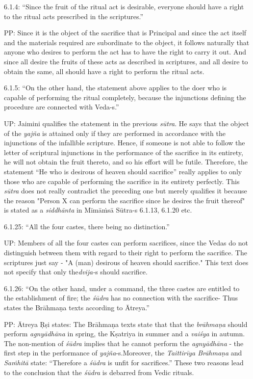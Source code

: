 6.1.4: “Since the fruit of the ritual act is desirable, everyone should have a right to the ritual acts prescribed in the scriptures.”

PP: Since it is the object of the sacrifice that is Principal and since the act itself and the materials required are subordinate to the object, it follows naturally that anyone who desires to perform the act has to have the right to carry it out. And since all desire the fruits of these acts as described in scriptures, and all desire to obtain the same, all should have a right to perform the ritual acts.

6.1.5: “On the other hand, the statement above applies to the doer who is capable of performing the ritual completely, because the injunctions defining the procedure are connected with Veda-s.”

UP: Jaimini qualifies the statement in the previous \textit{sūtra}. He says that the object of the \textit{yajña} is attained only if they are performed in accordance with the injunctions of the infallible scripture. Hence, if someone is not able to follow the letter of scriptural injunctions in the performance of the sacrifice in its entirety, he will not obtain the fruit thereto, and so his effort will be futile. Therefore, the statement “He who is desirous of heaven should sacrifice” really applies to only those who are capable of performing the sacrifice in its entirety perfectly. This \textit{sūtra} does not really contradict the preceding one but merely qualifies it because the reason "Person X can perform the sacrifice since he desires the fruit thereof" is stated as a \textit{siddhānta} in Mīmāṁsā Sūtra-s 6.1.13, 6.1.20 etc.

6.1.25: “All the four castes, there being no distinction.”

UP: Members of all the four castes can perform sacrifices, since the Vedas do not distinguish between them with regard to their right to perform the sacrifice. The scriptures just say - "A (man) desirous of heaven should sacrifice." This text does not specify that only the\break \textit{dvija-}s should sacrifice.

6.1.26: “On the other hand, under a command, the three castes are entitled to the establishment of fire; the \textit{śūdra} has no connection with the sacrifice- Thus states the Brāhmaṇa texts according to Ātreya.”

PP: Ātreya Ṛṣi states: The Brāhmaṇa texts state that that the \textit{brāhmaṇa} should perform \textit{agnyādhāna} in spring, the Kṣatriya in summer and a \textit{vaiśya} in autumn. The non-mention of \textit{śūdra} implies that he cannot perform the \textit{agnyādhāna} - the first step in the performance of \textit{yajña}-s.\break Moreover, the \textit{Taittirīya Brāhmaṇa} and \textit{Saṁhitā} state: “Therefore a \textit{śūdra} is unfit for sacrifices.” These two reasons lead to the conclusion that the \textit{śūdra} is debarred from Vedic rituals.

